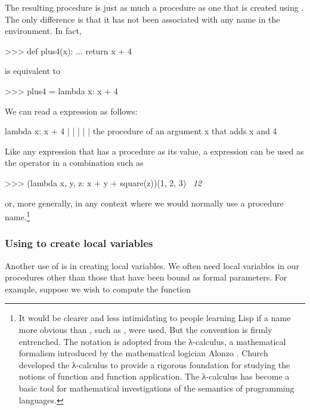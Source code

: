 \noindent
The resulting procedure is just as much a procedure as one that is created
using .  The only difference is that it has not been associated
with any name in the environment.  In fact,

\begin{codeBlock}
>>> def plus4(x):
...     return x + 4
\end{codeBlock}

\noindent
is equivalent to

\begin{codeBlock}
>>> plus4 = lambda x: x + 4
\end{codeBlock}

\noindent
We can read a  expression as follows:

\begin{codeBlock}
lambda                       x:       x  +   4
    |                        |       |   |   |
the procedure of an argument x that adds x and 4
\end{codeBlock}

\noindent
Like any expression that has a procedure as its value, a 
expression can be used as the operator in a combination such as

\begin{codeBlock}
>>> (lambda x, y, z: x + y + square(z))(1, 2, 3)
~\textit{12}~
\end{codeBlock}

\noindent
or, more generally, in any context where we would normally use a procedure
name.\footnote{It would be clearer and less intimidating to people learning
Lisp if a name more obvious than , such as ,
were used.  But the convention is firmly entrenched.  The notation is adopted
from the λ-calculus, a mathematical formalism introduced by the
mathematical logician Alonzo .  Church developed the
λ-calculus to provide a rigorous foundation for studying the
notions of function
and function application.  The λ-calculus has become a basic tool
for mathematical investigations of the semantics of programming languages.}

\subsubsection*{Using  to create local variables}

Another use of  is in creating local variables.  We often need
local variables in our procedures other than those that have been bound as
formal parameters.  For example, suppose we wish to compute the function

